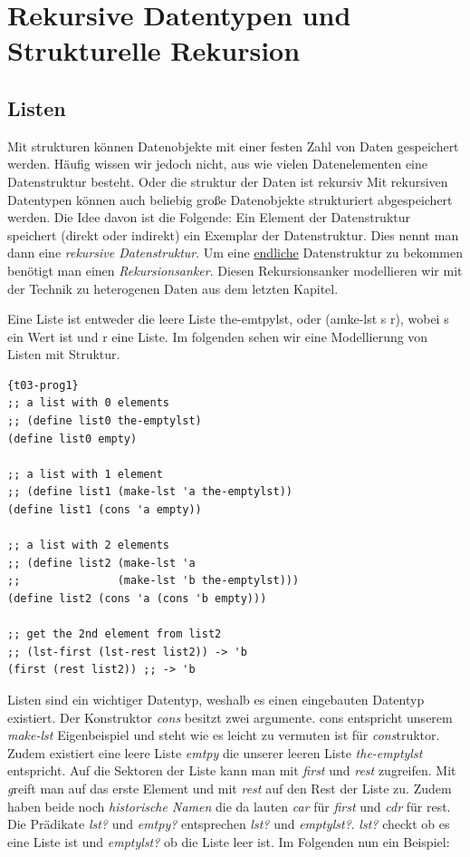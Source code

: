 \chapter{Rekursive Datentypen und Strukturelle Rekursion}
\section{Listen}
Mit strukturen können Datenobjekte mit einer festen Zahl von Daten gespeichert werden. Häufig wissen wir jedoch nicht, aus wie vielen Datenelementen eine Datenstruktur besteht.
Oder die struktur der Daten ist rekursiv
Mit rekursiven Datentypen können auch beliebig große Datenobjekte strukturiert abgespeichert werden. Die Idee davon ist die Folgende: Ein Element der Datenstruktur speichert (direkt oder indirekt) ein Exemplar der Datenstruktur. Dies nennt man dann eine \textit{rekursive Datenstruktur}. Um eine \uline{endliche} Datenstruktur zu bekommen benötigt man einen \textit{Rekursionsanker}. Diesen Rekursionsanker modellieren wir mit der Technik zu heterogenen Daten aus dem letzten Kapitel.

Eine Liste ist entweder die leere Liste the-emtpylst, oder (amke-lst s r), wobei s ein Wert ist und r eine Liste. Im folgenden sehen wir eine Modellierung von Listen mit Struktur.


\begin{lstlisting}{t03-prog1}
;; a list with 0 elements
;; (define list0 the-emptylst)
(define list0 empty)

;; a list with 1 element
;; (define list1 (make-lst 'a the-emptylst))
(define list1 (cons 'a empty))

;; a list with 2 elements
;; (define list2 (make-lst 'a
;;               (make-lst 'b the-emptylst)))
(define list2 (cons 'a (cons 'b empty)))

;; get the 2nd element from list2
;; (lst-first (lst-rest list2)) -> 'b
(first (rest list2)) ;; -> 'b
\end{lstlisting}

Listen sind ein wichtiger Datentyp, weshalb es einen eingebauten Datentyp existiert. Der Konstruktor \textit{cons} besitzt zwei argumente. cons entspricht unserem \textit{make-lst} Eigenbeispiel und steht wie es leicht zu vermuten ist für \textit{cons}truktor. Zudem existiert eine leere Liste \textit{emtpy} die unserer leeren Liste \textit{the-emptylst} entspricht. Auf die Sektoren der Liste kann man mit \textit{first} und \textit{rest} zugreifen. Mit \textit greift man auf das erste Element und mit \textit{rest} auf den Rest der Liste zu. Zudem haben beide noch \textit{historische Namen} die da lauten \textit{car} für \textit{first} und \textit{cdr} für rest. Die Prädikate \textit{lst?} und \textit{emtpy?} entsprechen \textit{lst?} und \textit{emptylst?}.
\textit{lst?} checkt ob es eine Liste ist und \textit{emptylst?} ob die Liste leer ist. Im Folgenden nun ein Beispiel:


